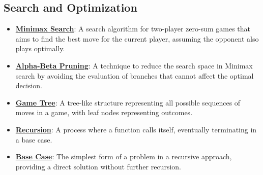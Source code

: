 \documentclass{article}%
\begin{document}
\subsection{Search and Optimization}%
\label{subsec:SearchandOptimization}%
\begin{itemize}[leftmargin=*]%
\item \href{https://purdue.brightspace.com/d2l/common/assets/pdfjs-d2l-dist/1.0.14-legacy/web/viewer.html?file=\%2Fcontent\%2Fenforced\%2F1095467-wl.202510.CS.24300.001\%2F02L2-Intro.pdf\%3Fou\%3D1095467\&lang=en-us\&container=d2l-fileviewer-rendered-pdf\&fullscreen=d2l-fileviewer-rendered-pdf-dialog\&height=667#page=22}{\textbf{Minimax Search}}: A search algorithm for two-player zero-sum games that aims to find the best move for the current player, assuming the opponent also plays optimally.%
\item \href{https://purdue.brightspace.com/d2l/common/assets/pdfjs-d2l-dist/1.0.14-legacy/web/viewer.html?file=\%2Fcontent\%2Fenforced\%2F1095467-wl.202510.CS.24300.001\%2F02L2-Intro.pdf\%3Fou\%3D1095467\&lang=en-us\&container=d2l-fileviewer-rendered-pdf\&fullscreen=d2l-fileviewer-rendered-pdf-dialog\&height=667#page=23}{\textbf{Alpha-Beta Pruning}}: A technique to reduce the search space in Minimax search by avoiding the evaluation of branches that cannot affect the optimal decision.%
\item \href{https://purdue.brightspace.com/d2l/common/assets/pdfjs-d2l-dist/1.0.14-legacy/web/viewer.html?file=\%2Fcontent\%2Fenforced\%2F1095467-wl.202510.CS.24300.001\%2F02L2-Intro.pdf\%3Fou\%3D1095467\&lang=en-us\&container=d2l-fileviewer-rendered-pdf\&fullscreen=d2l-fileviewer-rendered-pdf-dialog\&height=667#page=11}{\textbf{Game Tree}}: A tree-like structure representing all possible sequences of moves in a game, with leaf nodes representing outcomes.%
\item \href{https://purdue.brightspace.com/d2l/common/assets/pdfjs-d2l-dist/1.0.14-legacy/web/viewer.html?file=\%2Fcontent\%2Fenforced\%2F1095467-wl.202510.CS.24300.001\%2F14L1-DepthFS.pdf\%3Fou\%3D1095467\&lang=en-us\&container=d2l-fileviewer-rendered-pdf\&fullscreen=d2l-fileviewer-rendered-pdf-dialog\&height=667#page=2}{\textbf{Recursion}}: A process where a function calls itself, eventually terminating in a base case.%
\item \href{https://purdue.brightspace.com/d2l/common/assets/pdfjs-d2l-dist/1.0.14-legacy/web/viewer.html?file=\%2Fcontent\%2Fenforced\%2F1095467-wl.202510.CS.24300.001\%2F14L1-DepthFS.pdf\%3Fou\%3D1095467\&lang=en-us\&container=d2l-fileviewer-rendered-pdf\&fullscreen=d2l-fileviewer-rendered-pdf-dialog\&height=667#page=5}{\textbf{Base Case}}: The simplest form of a problem in a recursive approach, providing a direct solution without further recursion.%

\end{itemize}
\end{document}

